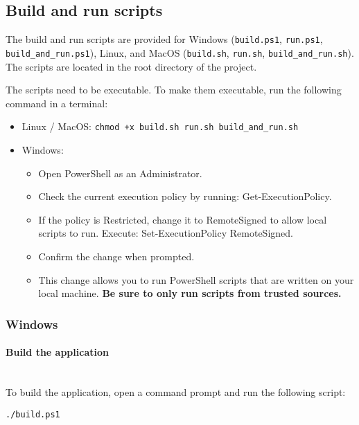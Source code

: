 \clearpage
\subsection{Build and run scripts}

The build and run scripts are provided for Windows (\texttt{build.ps1}, \texttt{run.ps1}, \texttt{build\_and\_run.ps1}), Linux, and
MacOS (\texttt{build.sh}, \texttt{run.sh}, \texttt{build\_and\_run.sh}). The scripts are located in the root directory of the project.

\begin{bfhWarnBox}
	The scripts need to be executable. To make them executable, run the following command in a terminal:
	\begin{itemize}
		\item Linux / MacOS: \texttt{chmod +x build.sh run.sh build\_and\_run.sh}
		\item Windows: 
		\begin{itemize}
			\item Open PowerShell as an Administrator. 
			\item Check the current execution policy by running: Get-ExecutionPolicy. 
			\item If the policy is Restricted, change it to RemoteSigned to allow local scripts to run. Execute: Set-ExecutionPolicy RemoteSigned. 
			\item Confirm the change when prompted.
			\item This change allows you to run PowerShell scripts that are written on your local machine. \textbf{Be sure to only run scripts from trusted sources.}
		\end{itemize}
	\end{itemize}
\end{bfhWarnBox}

\subsubsection{Windows}

\paragraph{Build the application}
\mbox{}\\
To build the application, open a command prompt and run the following script:

\begin{lstlisting}[numbers=none, caption={Script to Build the URL-Archiver Application on Windows}, label={lst:build_win}]
./build.ps1
\end{lstlisting}


